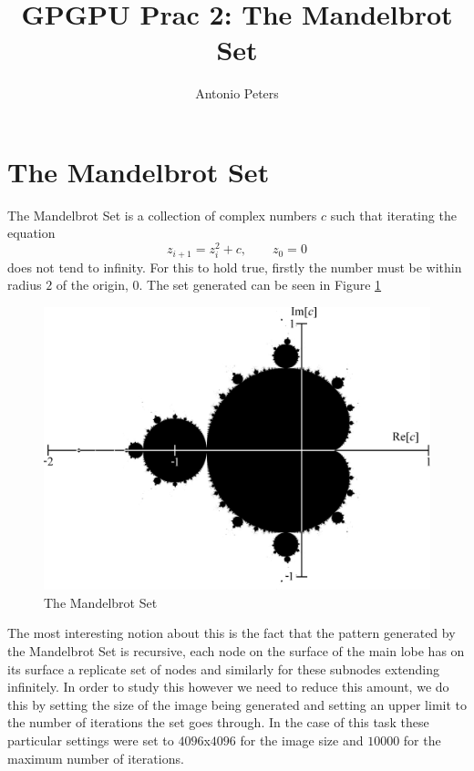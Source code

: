 \documentclass[a4paper,10pt]{article}
\title{GPGPU Prac 2: The Mandelbrot Set}
\author{Antonio Peters}
\begin{document}
\maketitle

\section{The Mandelbrot Set}
The Mandelbrot Set is a collection of complex numbers $c$ such that iterating the equation
\begin{equation}
  z_{i+1} = z_i^2 + c, \qquad z_0=0
\end{equation}
does not tend to infinity.
\linebreak
For this to hold true, firstly the number must be within radius $2$ of the origin, $0$. The set generated can be seen in Figure \ref{mandelimg}
\begin{figure}[H] \label{mandelimg}
\includegraphics[width=\textwidth]{Mandelset_hires.png}
\caption{The Mandelbrot Set}
\end{figure}
The most interesting notion about this is the fact that the pattern generated by the Mandelbrot Set is recursive, each node on the surface of the main lobe has on its surface a replicate set of nodes and similarly for these subnodes extending infinitely. In order to study this however we need to reduce this amount, we do this by setting the size of the image being generated and setting an upper limit to the number of iterations the set goes through. In the case of this task these particular settings were set to $4096$x$4096$ for the image size and $10000$ for the maximum number of iterations.
\end{document}
